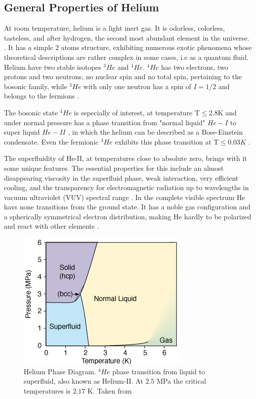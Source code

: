 \subsection{General Properties of Helium}


At room temperature, helium is a light inert gas. It is odorless, colorless, tasteless, and after hydrogen, the second most abundant element in the universe.  \cite{enss_low-temperature_2005}. It has a simple 2 atoms structure, exhibiting numerous exotic phenomena whose theoretical descriptions are rather complex in some cases, i.e as a quantum fluid. Helium have two stable isotopes $^{3}He$ and $^{4}He$.  $^{4}He$ has two electrons, two protons and two neutrons, no nuclear spin and no total spin, pertaining to the bosonic family, while $^{3}He$ with only one neutron has a spin of $I = 1/2$ and belongs to the fermions \cite{atkins_liquid_2014}.

The bosonic state $^{4}He$ is especially of interest, at temperature T$\leqslant$2.8K and under normal pressure has a phase transition from "normal liquid" $He-I$ to super liquid $He-II$ \cite{swenson_liquid-solid_1950}, in which the helium can be described as a Bose-Einstein condensate. Even the fermionic $^{3}He$ exhibits this phase transition at T$\leqslant 0.03K$ \cite{halperin_properties_1978}.

The superfluidity of He-II, at temperatures close to absolute zero, brings with it some unique features. The essential properties for this include an almost disappearing viscosity in the superfluid phase, weak interaction, very efficient cooling, and the transparency for electromagnetic radiation up to wavelengths in vacuum ultraviolet (VUV) spectral range \cite{enss_low-temperature_2005}. In the complete visible spectrum He havs none transitions from the ground state. It has a noble gas configuration and  a spherically symmetrical electron distribution, making He hardly to be polarized and  react with other elements  \cite{lewis_Helium_2014}.

\begin{figure}[h!]
\centering
\includegraphics[width=8 cm]{../Images/He_temp_phases.png}
\caption[Helium phase diagram]{Helium Phase Diagram. $^{4}He$ phase transition from liquid to superfluid, also known as Helium-II. At $2.5$ MPa the critical temperatures is $2.17$ K. Taken from \cite{noauthor_Helium_nodate}}

\end{figure}


